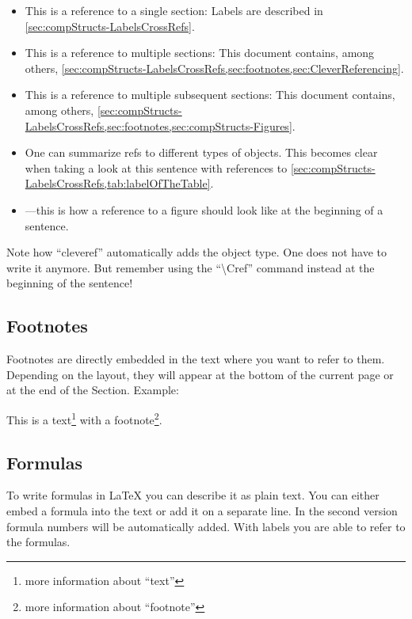 \documentclass[numbered]{ivt-style/standard}\usepackage[]{graphicx}\usepackage[]{xcolor}
\begin{document}
\begin{itemize}
  \item This is a reference to a single section: Labels are described
in \cref{sec:compStructs-LabelsCrossRefs}.
  \item This is a reference to multiple sections: This document
contains, among others,
\cref{sec:compStructs-LabelsCrossRefs,sec:footnotes,sec:CleverReferencing}.
  \item This is a reference to multiple subsequent sections: This
document contains, among others,
\cref{sec:compStructs-LabelsCrossRefs,sec:footnotes,sec:compStructs-Figures}.
  \item One can summarize refs to different types of objects. This
becomes clear when taking a look at this sentence with references to
\cref{sec:compStructs-LabelsCrossRefs,tab:labelOfTheTable}.
  \item {}---this is how a reference to a figure
    should look like at the beginning of a sentence.
\end{itemize}

Note how ``cleveref'' automatically adds the object type. One does not
have to write it anymore.
But remember using the ``\textbackslash{}Cref'' command instead
at the beginning of the sentence!

\subsection{Footnotes}\label{sec:footnotes}

Footnotes are directly embedded in the text where you want to refer to
them.
Depending on the layout, they will appear at the bottom of the current
page or
at the end of the Section. Example:

This is a text\footnote{more information about ``text''} with a
footnote\footnote{more information about ``footnote''}.


\subsection{Formulas}

To write formulas in \LaTeX{} you can describe it as plain text.
You can either embed a formula into the text or add it on a separate
line.
In the second version formula numbers will be automatically added.
With labels you are able to refer to the formulas.
\end{document}
